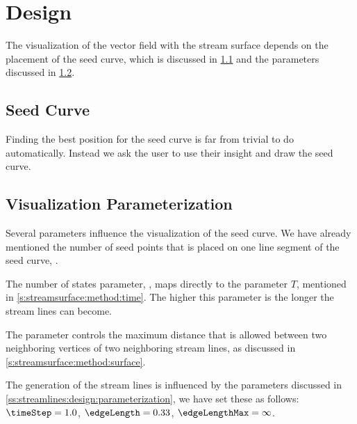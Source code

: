\section{Design}
\label{s:streamsurfaces:design}

The visualization of the vector field with the stream surface depends on the placement of the seed curve, which is discussed in \cref{s:streamsurfaces:design:seedcurve} and the parameters discussed in \cref{s:streamsurfaces:design:parameterization}.

\subsection{Seed Curve}
\label{s:streamsurfaces:design:seedcurve}
Finding the best position for the seed curve is far from trivial to do automatically. Instead we ask the user to use their insight and draw the seed curve. 

\subsection{Visualization Parameterization}
\label{s:streamsurfaces:design:parameterization}
Several parameters influence the visualization of the seed curve. We have already mentioned the number of seed points that is placed on one line segment of the seed curve, \ie \resolution. 

The number of states parameter, \numStates, maps directly to the parameter $T$, mentioned in \cref{s:streamsurface:method:time}. The higher this parameter is the longer the stream lines can become. 

The parameter \divergenceCriterion controls the maximum distance that is allowed between two neighboring vertices of two neighboring stream lines, as discussed in \cref{s:streamsurface:method:surface}.

The generation of the stream lines is influenced by the parameters discussed in \cref{ss:streamlines:design:parameterization}, we have set these as follows: $\timeStep = 1.0$, $\edgeLength = 0.33$, $\edgeLengthMax = \infty$.